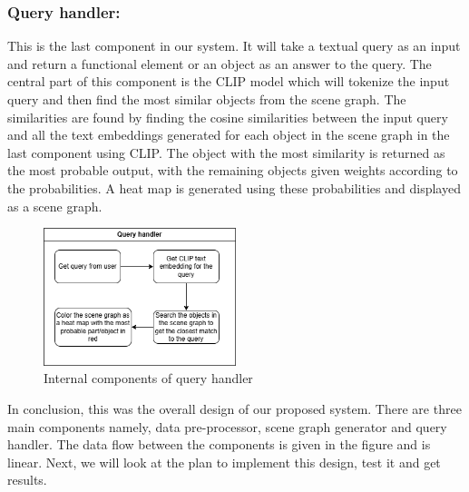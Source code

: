 \subsubsection{Query handler:}
This is the last component in our system. It will take a textual query as an input and return a functional element or an object as an answer to the query. The central
part of this component is the CLIP model which will tokenize the input query and then find the most similar objects from the scene graph. The similarities are found 
by finding the cosine similarities between the input query and all the text embeddings generated for each object in the scene graph in the last component using CLIP.
The object with the most similarity is returned as the most probable output, with the remaining objects given weights according to the probabilities. A heat map is 
generated using these probabilities and displayed as a scene graph.\\
\begin{figure}[ht!]
    \centering
    \includegraphics[width=0.5\textwidth]{content/images/QueryHandler.png}
    \caption{Internal components of query handler}
    \label{fig:queryHandler}
\end{figure}

In conclusion, this was the overall design of our proposed system. There are three main components namely, data pre-processor, scene graph generator and query handler. 
The data flow between the components is given in the figure and is linear. Next, we will look at the plan to implement this design, test it and get results.
